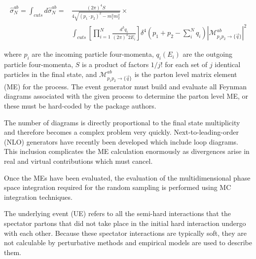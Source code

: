 \begin{equation}
\begin{split}\label{eq:event_generation_partonic_cross_section}
\hat{\sigma}_{N}^{ab}=\int_{cuts}d\hat{\sigma}_{N}^{ab}={}&\frac{\left(2\pi\right)^{4}S}{4\sqrt{\left(p_{1}{\cdot}p_{2}\right)^{2}-m_{1}^{2}m_{2}^{2}}}\times \\ &\int_{cuts} \left[\prod_{i=1}^{N}\frac{d^{3}q_{i}}{\left(2\pi\right)^{3}2E_{i}}\right]\delta^{4}\left(p_{1}+p_{2}-\sum_{i}^{N}q_{i}\right)|\mathcal{M}_{p_{1}p_{2}\rightarrow\{\vec{q}\}}^{ab}|^{2}
\end{split}
\end{equation}

where $p_{i}$ are the incoming particle four-momenta, $q_{i}(E_{i})$ are the outgoing particle four-momenta, $S$ is a product of factors $1/j!$ for each set of $j$ identical particles in the final state, and $\mathcal{M}_{p_{1}p_{2}\rightarrow\{\vec{q}\}}^{ab}$ is the parton level matrix element (ME) for the process. The event generator must build and evaluate all Feynman diagrams associated with the given process to determine the parton level ME, or these must be hard-coded by the package authors. 

The number of diagrams is directly proportional to the final state multiplicity and therefore becomes a complex problem very quickly. Next-to-leading-order (NLO) generators have recently been developed which include loop diagrams. This inclusion complicates the ME calculation enormously as divergences arise in real and virtual contributions which must cancel. 

Once the MEs have been evaluated, the evaluation of the multidimensional phase space integration required for the random sampling is performed using MC integration techniques\cite{Binder_1997}. 

The underlying event (UE) refers to all the semi-hard interactions that the spectator partons that did not take place in the initial hard interaction undergo with each other. Because these spectator interactions are typically soft, they are not calculable by perturbative methods and empirical models are used to describe them.

